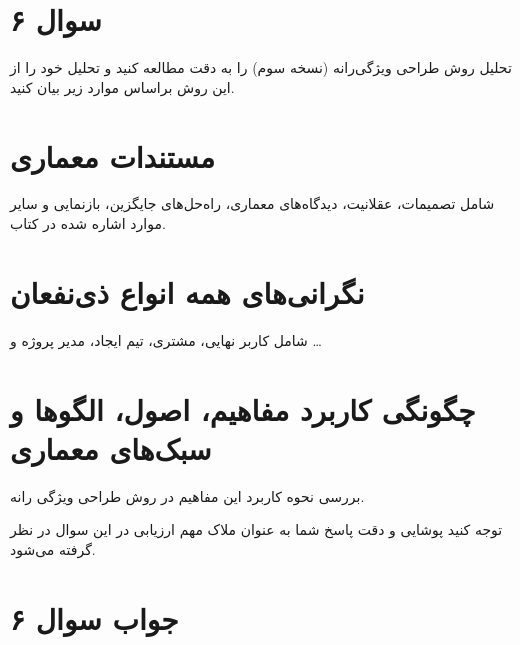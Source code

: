 \section*{سوال ۶}

تحلیل روش طراحی ویژگی‌رانه (نسخه سوم) را به دقت مطالعه کنید و تحلیل خود را از این روش براساس موارد زیر بیان کنید.


\section*{مستندات معماری}
شامل تصمیمات، عقلانیت، دیدگاه‌های معماری، راه‌حل‌های جایگزین، بازنمایی و سایر موارد اشاره شده در کتاب.

\section*{نگرانی‌های همه انواع ذی‌نفعان}
شامل کاربر نهایی، مشتری، تیم ایجاد، مدیر پروژه و …

\section*{چگونگی کاربرد مفاهیم، اصول، الگوها و سبک‌های معماری}
بررسی نحوه کاربرد این مفاهیم در روش طراحی ویژگی رانه.

توجه کنید پوشایی و دقت پاسخ شما به عنوان ملاک مهم ارزیابی در این سوال در نظر گرفته می‌شود.

\section*{جواب سوال ۶}

